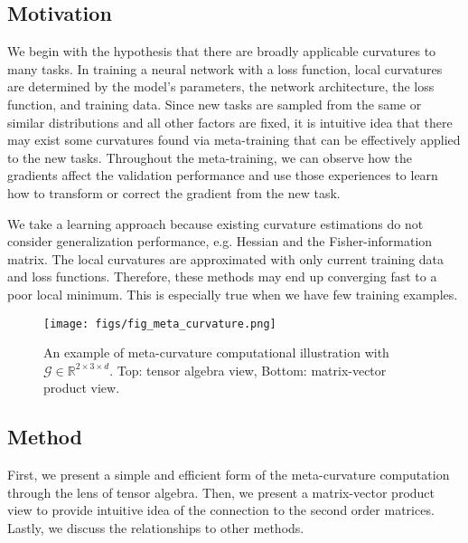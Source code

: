\documentclass{article}
\begin{document}
\subsection{Motivation}
We begin with the hypothesis that there are broadly applicable curvatures to many tasks. In training a neural network with a loss function, local curvatures are determined by the model’s parameters, the network architecture, the loss function, and training data. Since new tasks are sampled from the same or similar distributions and all other factors are fixed, it is intuitive idea that there may exist some curvatures found via meta-training that can be effectively applied to the new tasks. Throughout the meta-training, we can observe how the gradients affect the validation performance and use those experiences to learn how to transform or correct the gradient from the new task.

We take a learning approach because existing curvature estimations do not consider generalization performance, e.g. Hessian and the Fisher-information matrix. The local curvatures are approximated with only current training data and loss functions. Therefore, these methods may end up converging fast to a poor local minimum. This is especially true when we have few training examples.



\begin{figure*}[t]
\begin{center}
\centerline{\texttt{[image: figs/fig\_meta\_curvature.png]}}
\caption{An example of meta-curvature computational illustration with $\mathcal{G} \in \mathbb{R}^{2 \times 3 \times d}$. Top: tensor algebra view, Bottom: matrix-vector product view.}
\label{fig_meta_curvature}
\end{center}
\vskip -0.3in
\end{figure*}


\subsection{Method}
First, we present a simple and efficient form of the meta-curvature computation through the lens of tensor algebra. Then, we present a matrix-vector product view to provide intuitive idea of the connection to the second order matrices. Lastly, we discuss the relationships to other methods.
\end{document}
